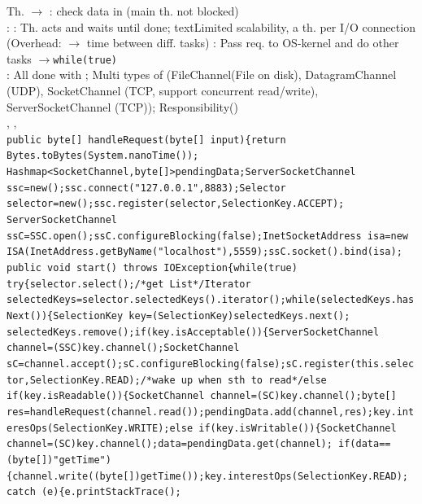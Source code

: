 Th. $\rightarrow$ : 
check data in  (main th. not blocked)
\\
: 
: Th. acts and waits until  done; 
\orangetext{}text{Limited scalability}, a th. per I/O connection
(Overhead: $\rightarrow$ time between diff. tasks)
: Pass req. to OS-kernel and do other tasks 
$\rightarrow$\lstinline{while(true)} 
\rtext{++:}
\rtext{--:}
\\
: 
All  done with ;
Multi types of 
(FileChannel(File on disk), 
DatagramChannel (UDP), 
SocketChannel (TCP, support concurrent read/write), 
ServerSocketChannel (TCP));
Responsibility()
\\
\textbar
{} , 
 ,
 
\\
\lstinline{public byte[] handleRequest(byte[] input){return Bytes.toBytes(System.nanoTime());}
\lstinline{Hashmap<SocketChannel,byte[]>pendingData;ServerSocketChannel ssc=new();ssc.connect("127.0.0.1",8883);Selector selector=new();ssc.register(selector,SelectionKey.ACCEPT);}
\lstinline{ServerSocketChannel ssC=SSC.open();ssC.configureBlocking(false);InetSocketAddress isa=new ISA(InetAddress.getByName("localhost"),5559);ssC.socket().bind(isa);}
\lstinline{public void start() throws IOException{while(true) try{selector.select();/*get List*/Iterator selectedKeys=selector.selectedKeys().iterator();while(selectedKeys.hasNext()){SelectionKey key=(SelectionKey)selectedKeys.next(); selectedKeys.remove();if(key.isAcceptable()){ServerSocketChannel channel=(SSC)key.channel();SocketChannel sC=channel.accept();sC.configureBlocking(false);sC.register(this.selector,SelectionKey.READ);/*wake up when sth to read*/else if(key.isReadable()){SocketChannel channel=(SC)key.channel();byte[] res=handleRequest(channel.read());pendingData.add(channel,res);key.interesOps(SelectionKey.WRITE);else if(key.isWritable()){SocketChannel channel=(SC)key.channel();data=pendingData.get(channel); if(data==(byte[])"getTime"){channel.write((byte[])getTime());key.interestOps(SelectionKey.READ); catch (e){e.printStackTrace();}
